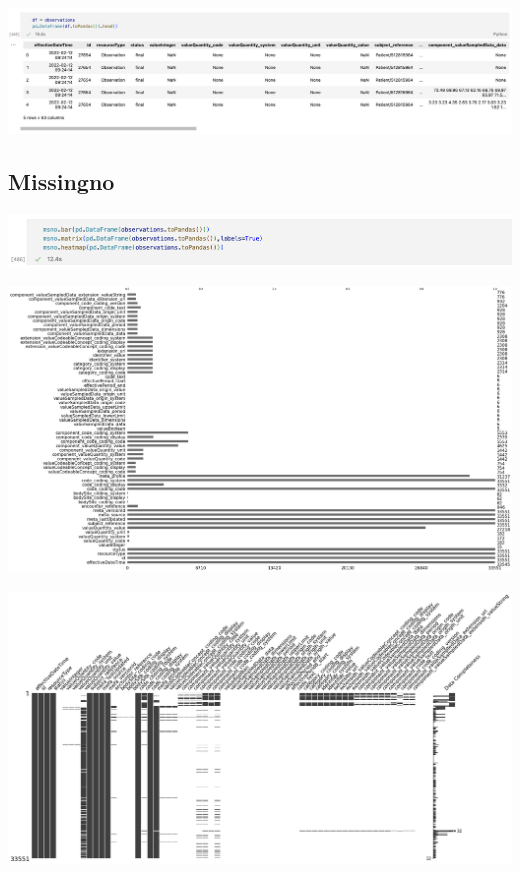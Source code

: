 \documentclass[11pt, oneside]{article}
\begin{document}
\begin{center}
\includegraphics[scale=0.4]{2_obs.png}
\end{center}

\subsection{Missingno}

\begin{center}
\includegraphics[scale=0.4]{2_msn.png}
\end{center}
\begin{center}
\includegraphics[scale=0.2]{2_msn_bars.png}
\end{center}
\begin{center}
\includegraphics[scale=0.25]{2_msn_matrix.png}
\end{center}
\end{document}
